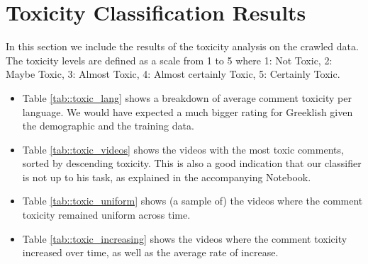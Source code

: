 \documentclass[11pt, a4paper]{article}
\begin{document}
	
	
	\section{Toxicity Classification Results}
	
	In this section we include the results of the toxicity analysis on the crawled data. The toxicity levels are defined as a scale from 1 to 5 where 1: Not Toxic, 	2: Maybe Toxic, 3: Almost Toxic,	4: Almost certainly Toxic, 5: Certainly Toxic.
	
	\begin{itemize}
		\item Table \ref{tab::toxic_lang} shows a breakdown of average comment toxicity per language. We would have expected a much bigger rating for Greeklish given the demographic and the training data.
		
		\item Table \ref{tab::toxic_videos} shows the videos with the most toxic comments, sorted by descending toxicity. This is also a good indication that our classifier is not up to his task, as explained in the accompanying Notebook.
		
		\item Table \ref{tab::toxic_uniform} shows (a sample of) the videos where the comment toxicity remained uniform across time.
		
		\item Table \ref{tab::toxic_increasing} shows the videos where the comment toxicity increased over time, as well as the average rate of increase.
	\end{itemize}
	
	
	
	
	
	
	
	
	
\end{document}
